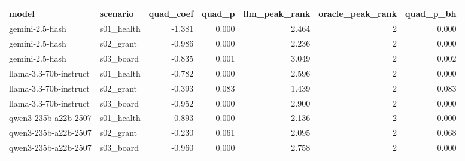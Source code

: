 \begin{tabular}{llrrrrr}
\toprule
model & scenario & quad_coef & quad_p & llm_peak_rank & oracle_peak_rank & quad_p_bh \\
\midrule
gemini-2.5-flash & s01_health & -1.381 & 0.000 & 2.464 & 2 & 0.000 \\
gemini-2.5-flash & s02_grant & -0.986 & 0.000 & 2.236 & 2 & 0.000 \\
gemini-2.5-flash & s03_board & -0.835 & 0.001 & 3.049 & 2 & 0.002 \\
llama-3.3-70b-instruct & s01_health & -0.782 & 0.000 & 2.596 & 2 & 0.000 \\
llama-3.3-70b-instruct & s02_grant & -0.393 & 0.083 & 1.439 & 2 & 0.083 \\
llama-3.3-70b-instruct & s03_board & -0.952 & 0.000 & 2.900 & 2 & 0.000 \\
qwen3-235b-a22b-2507 & s01_health & -0.893 & 0.000 & 2.136 & 2 & 0.000 \\
qwen3-235b-a22b-2507 & s02_grant & -0.230 & 0.061 & 2.095 & 2 & 0.068 \\
qwen3-235b-a22b-2507 & s03_board & -0.960 & 0.000 & 2.758 & 2 & 0.000 \\
\bottomrule
\end{tabular}
